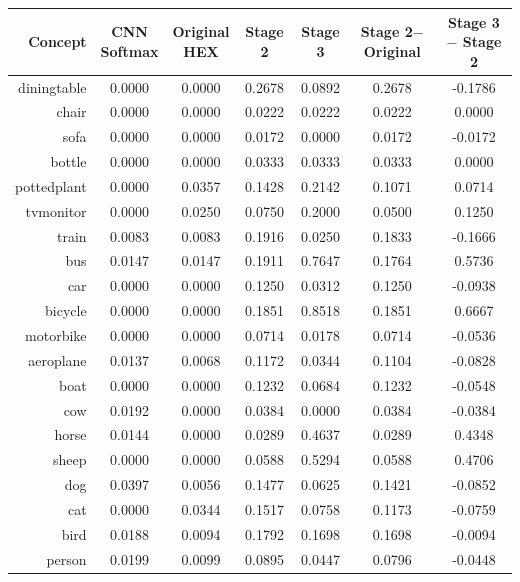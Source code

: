 \documentclass[11pt,a4paper]{book}
\begin{document}
\begin{table}[htbp]
\centering
\begin{tabular}{r|c|c|c|c|c|c}
Concept & \makecell{CNN\\Softmax} & \makecell{Original\\HEX} & Stage 2 & Stage 3 & \makecell{Stage 2$-$\\Original} & \makecell{Stage 3$-$\\Stage 2}\\\hline
diningtable   & 0.0000 & 0.0000 & 0.2678 & 0.0892 & 0.2678 & -0.1786\\
chair         & 0.0000 & 0.0000 & 0.0222 & 0.0222 & 0.0222 & 0.0000\\
sofa          & 0.0000 & 0.0000 & 0.0172 & 0.0000 & 0.0172 & -0.0172\\
bottle        & 0.0000 & 0.0000 & 0.0333 & 0.0333 & 0.0333 & 0.0000\\
pottedplant   & 0.0000 & 0.0357 & 0.1428 & 0.2142 & 0.1071 & 0.0714\\
tvmonitor     & 0.0000 & 0.0250 & 0.0750 & 0.2000 & 0.0500 & 0.1250\\
train         & 0.0083 & 0.0083 & 0.1916 & 0.0250 & 0.1833 & -0.1666\\
bus           & 0.0147 & 0.0147 & 0.1911 & 0.7647 & 0.1764 & 0.5736\\
car           & 0.0000 & 0.0000 & 0.1250 & 0.0312 & 0.1250 & -0.0938\\
bicycle       & 0.0000 & 0.0000 & 0.1851 & 0.8518 & 0.1851 & 0.6667\\
motorbike     & 0.0000 & 0.0000 & 0.0714 & 0.0178 & 0.0714 & -0.0536\\
aeroplane     & 0.0137 & 0.0068 & 0.1172 & 0.0344 & 0.1104 & -0.0828\\
boat          & 0.0000 & 0.0000 & 0.1232 & 0.0684 & 0.1232 & -0.0548\\
cow           & 0.0192 & 0.0000 & 0.0384 & 0.0000 & 0.0384 & -0.0384\\
horse         & 0.0144 & 0.0000 & 0.0289 & 0.4637 & 0.0289 & 0.4348\\
sheep         & 0.0000 & 0.0000 & 0.0588 & 0.5294 & 0.0588 & 0.4706\\
dog           & 0.0397 & 0.0056 & 0.1477 & 0.0625 & 0.1421 & -0.0852\\
cat           & 0.0000 & 0.0344 & 0.1517 & 0.0758 & 0.1173 & -0.0759\\
bird          & 0.0188 & 0.0094 & 0.1792 & 0.1698 & 0.1698 & -0.0094\\
person        & 0.0199 & 0.0099 & 0.0895 & 0.0447 & 0.0796 & -0.0448\\\hline

\end{tabular}
\end{table}
\end{document}
